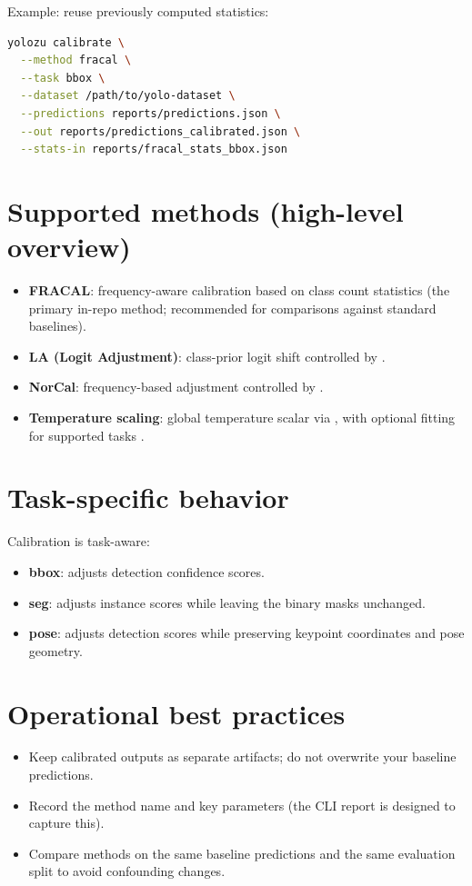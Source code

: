 Example: reuse previously computed statistics:
\begin{lstlisting}[language=bash]
yolozu calibrate \
  --method fracal \
  --task bbox \
  --dataset /path/to/yolo-dataset \
  --predictions reports/predictions.json \
  --out reports/predictions_calibrated.json \
  --stats-in reports/fracal_stats_bbox.json
\end{lstlisting}

\section{Supported methods (high-level overview)}
\begin{itemize}
  \item \textbf{FRACAL}: frequency-aware calibration based on class count statistics (the primary in-repo method; recommended for comparisons against standard baselines).
  \item \textbf{LA (Logit Adjustment)}: class-prior logit shift controlled by  \cite{menon2021longtail}.
  \item \textbf{NorCal}: frequency-based adjustment controlled by .
  \item \textbf{Temperature scaling}: global temperature scalar via , with optional fitting for supported tasks \cite{guo2017calibration}.
\end{itemize}

\section{Task-specific behavior}
Calibration is task-aware:
\begin{itemize}
  \item \textbf{bbox}: adjusts detection confidence scores.
  \item \textbf{seg}: adjusts instance scores while leaving the binary masks unchanged.
  \item \textbf{pose}: adjusts detection scores while preserving keypoint coordinates and pose geometry.
\end{itemize}

\section{Operational best practices}
\begin{itemize}
  \item Keep calibrated outputs as separate artifacts; do not overwrite your baseline predictions.
  \item Record the method name and key parameters (the CLI report is designed to capture this).
  \item Compare methods on the same baseline predictions and the same evaluation split to avoid confounding changes.
\end{itemize}
